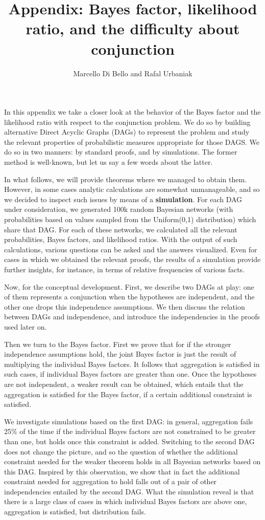 \documentclass[
  10pt,
  dvipsnames,enabledeprecatedfontcommands]{scrartcl}
\title{Appendix: Bayes factor, likelihood ratio, and the difficulty
about conjunction}
\author{Marcello Di Bello and Rafal Urbaniak}
\date{}
\begin{document}
\maketitle

In this appendix we take a closer look at the behavior of the Bayes
factor and the likelihood ratio with respect to the conjunction problem.
We do so by building alternative Direct Acyclic Graphs (DAGs) to
represent the problem and study the relevant properties of probabilistic
measures appropriate for those DAGS. We do so in two manners: by
standard proofs, and by simulations. The former method is well-known,
but let us say a few words about the latter.

In what follows, we will provide theorems where we managed to obtain
them. However, in some cases analytic calculations are somewhat
unmanageable, and so we decided to inspect such issues by means of a
\textbf{simulation}. For each DAG under consideration, we generated 100k
random Bayesian networks (with probabilities based on values sampled
from the \textsf{Uniform(0,1)} distribution) which share that DAG. For
each of these networks, we calculated all the relevant probabilities,
Bayes factors, and likelihood ratios. With the output of such
calculations, various questions can be asked and the answers visualized.
Even for cases in which we obtained the relevant proofs, the results of
a simulation provide further insights, for instance, in terms of
relative frequencies of various facts.

Now, for the conceptual development. First, we describe two
\textsf{DAG}s at play: one of them represents a conjunction when the
hypotheses are independent, and the other one drops this independence
assumptions. We then discuss the relation between \textsf{DAG}s and
independence, and introduce the independencies in the proofs used later
on.

Then we turn to the Bayes factor. First we prove that for if the
stronger independence assumptions hold, the joint Bayes factor is just
the result of multiplying the individual Bayes factors. It follows that
aggregation is satisfied in such cases, if individual Bayes factors are
greater than one. Once the hypotheses are not independent, a weaker
result can be obtained, which entails that the aggregation is satisfied
for the Bayes factor, if a certain additional constraint is satisfied.

We investigate simulations based on the first \textsf{DAG}: in general,
aggregation fails 25\% of the time if the individual Bayes factors are
not constrained to be greater than one, but holds once this constraint
is added. Switching to the second \textsf{DAG} does not change the
picture, and so the question of whether the additional constraint needed
for the weaker theorem holds in all Bayesian networks based on this
\textsf{DAG}. Inspired by this observation, we show that in fact the
additional constraint needed for aggregation to hold falls out of a pair
of other independencies entailed by the second \textsf{DAG}. What the
simulation reveal is that there is a large class of cases in which
individual Bayes factors are above one, aggregation is satisfied, but
distribution fails.
\end{document}
